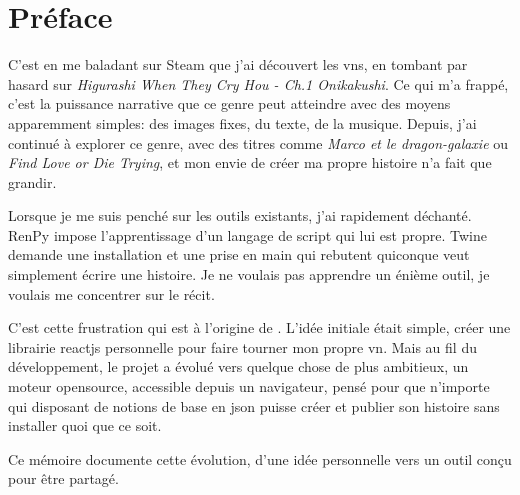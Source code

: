 \section*{Préface}

C'est en me baladant sur Steam que j'ai découvert les \acrlong{vn}s, en tombant par hasard sur \textit{Higurashi When They Cry Hou - Ch.1 Onikakushi}. Ce qui m'a frappé, c'est la puissance narrative que ce genre peut atteindre avec des moyens apparemment simples: des images fixes, du texte, de la musique. Depuis, j'ai continué à explorer ce genre, avec des titres comme \textit{Marco et le dragon-galaxie} ou \textit{Find Love or Die Trying}, et mon envie de créer ma propre histoire n'a fait que grandir.

Lorsque je me suis penché sur les outils existants, j'ai rapidement déchanté. RenPy impose l'apprentissage d'un langage de script qui lui est propre. Twine demande une installation et une prise en main qui rebutent quiconque veut simplement écrire une histoire. Je ne voulais pas apprendre un énième outil, je voulais me concentrer sur le récit.

C'est cette frustration qui est à l'origine de \nsit. L'idée initiale était simple, créer une \gls{librairie} \gls{reactjs} personnelle pour faire tourner mon propre \acrlong{vn}. Mais au fil du développement, le projet a évolué vers quelque chose de plus ambitieux, un moteur \gls{opensource}, accessible depuis un navigateur, pensé pour que n'importe qui disposant de notions de base en \acrshort{json} puisse créer et publier son histoire sans installer quoi que ce soit.

Ce mémoire documente cette évolution, d'une idée personnelle vers un outil conçu pour être partagé.